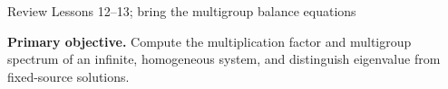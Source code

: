 \providecommand{\dd}{\,\mathrm{d}}
\AtBeginDocument{\setlength{\abovedisplayskip}{4pt plus 1pt minus 1pt}
\setlength{\belowdisplayskip}{4pt plus 1pt minus 1pt}
\setlength{\abovedisplayshortskip}{3pt plus 1pt}
\setlength{\belowdisplayshortskip}{3pt plus 1pt}
\setlength{\jot}{2pt}
}

  {Review Lessons 12--13; bring the multigroup balance equations}

\MakeHandoutTitle
\textcolor{KSUDeepPurple}{\textbf{Primary objective.}}
Compute the multiplication factor and multigroup spectrum of an
infinite, homogeneous system, and distinguish eigenvalue from fixed-source solutions.
\par\vspace{5pt}

